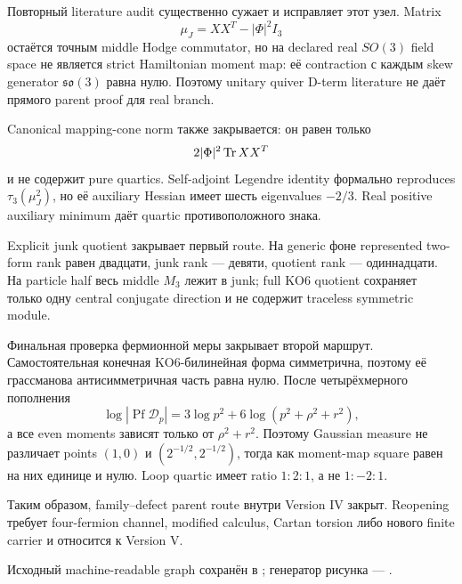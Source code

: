 Повторный literature audit существенно сужает и исправляет этот узел.
Matrix
\begin{equation}
 \mu_J=XX^T-|\Phi|^2I_3
\end{equation}
остаётся точным middle Hodge commutator, но на declared real \(SO(3)\)
field space не является strict Hamiltonian moment map: её contraction с
каждым skew generator \(\mathfrak{so}(3)\) равна нулю. Поэтому unitary
quiver D-term literature не даёт прямого parent proof для real branch.

Canonical mapping-cone norm также закрывается: он равен только
\begin{equation}
 2|\Phi|^2\operatorname{Tr} XX^T
\end{equation}
и не содержит pure quartics. Self-adjoint Legendre identity формально
reproduces \(\tau_3(\mu_J^2)\), но её auxiliary Hessian имеет шесть
eigenvalues \(-2/3\). Real positive auxiliary minimum даёт quartic
противоположного знака.

Explicit junk quotient закрывает первый route. На generic фоне represented
two-form rank равен двадцати, junk rank --- девяти, quotient rank ---
одиннадцати. На particle half весь middle \(M_3\) лежит в junk; full KO6
quotient сохраняет только одну central conjugate direction и не содержит
traceless symmetric module.

Финальная проверка фермионной меры закрывает второй маршрут. Самостоятельная
конечная KO6-билинейная форма симметрична, поэтому её грассманова
антисимметричная часть равна нулю. После четырёхмерного пополнения
\begin{equation}
 \log|\operatorname{Pf}\mathcal D_p|
 =3\log p^2+6\log(p^2+\rho^2+r^2),
\end{equation}
а все even moments зависят только от \(\rho^2+r^2\). Поэтому Gaussian
measure не различает points \((1,0)\) и
\((2^{-1/2},2^{-1/2})\), тогда как moment-map square равен на них единице
и нулю. Loop quartic имеет ratio \(1:2:1\), а не \(1:-2:1\).

Таким образом, family--defect parent route внутри Version IV закрыт.
Reopening требует four-fermion channel, modified calculus, Cartan torsion
либо нового finite carrier и относится к Version V.

Исходный machine-readable graph сохранён в
; генератор рисунка ---
.
